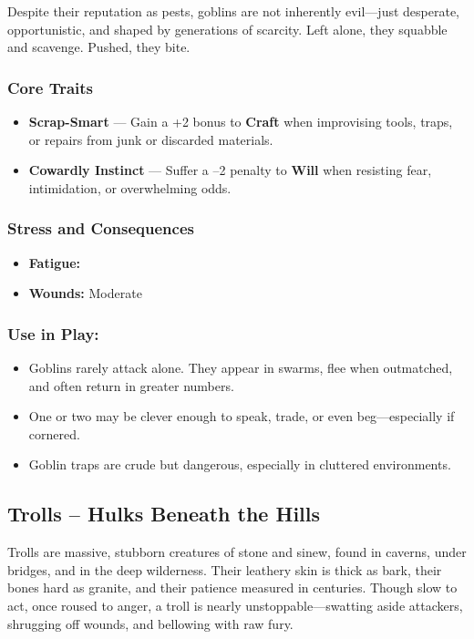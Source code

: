 Despite their reputation as pests, goblins are not inherently evil—just desperate, opportunistic, and shaped by generations of scarcity. Left alone, they squabble and scavenge. Pushed, they bite.

\subsubsection*{Core Traits}
\begin{itemize}
  \item \textbf{Scrap-Smart} — Gain a +2 bonus to \textbf{Craft} when improvising tools, traps, or repairs from junk or discarded materials.

  \item \textbf{Cowardly Instinct} — Suffer a –2 penalty to \textbf{Will} when resisting fear, intimidation, or overwhelming odds.
\end{itemize}

\subsubsection*{Stress and Consequences}
\begin{itemize}
  \item \textbf{Fatigue:} \FatigueBox\FatigueBox
  \item \textbf{Wounds:} Moderate \ModerateWound
\end{itemize}

\subsubsection*{Use in Play:}
\begin{itemize}
  \item Goblins rarely attack alone. They appear in swarms, flee when outmatched, and often return in greater numbers.
  \item One or two may be clever enough to speak, trade, or even beg—especially if cornered.
  \item Goblin traps are crude but dangerous, especially in cluttered environments.
\end{itemize}


\subsection*{Trolls – Hulks Beneath the Hills}

Trolls are massive, stubborn creatures of stone and sinew, found in caverns, under bridges, and in the deep wilderness. Their leathery skin is thick as bark, their bones hard as granite, and their patience measured in centuries. Though slow to act, once roused to anger, a troll is nearly unstoppable—swatting aside attackers, shrugging off wounds, and bellowing with raw fury.

